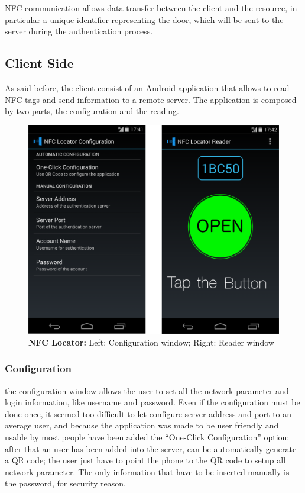 \documentclass[conference]{IEEEtran}
\begin{document}
NFC communication allows data transfer between the client and the resource, in particular a unique identifier representing the door, which will be sent to the server during the authentication process.

\subsection{Client Side}

As said before, the client consist of an Android application that allows to read NFC tags and send information to a remote server.
The application is composed by two parts, the configuration and the reading.

\begin{figure}[h]
\centering
\includegraphics[scale=0.15]{fig2}
\caption{\textbf{NFC Locator: }Left: Configuration window; Right: Reader window}
\label{fig_sim}
\end{figure}

\subsubsection{Configuration}

the configuration window allows the user to set all the network parameter and login information, like username and password.
Even if the configuration must be done once, it seemed too difficult to let configure server address and port to an average user, and because the application was made to be user friendly and usable by most people have been added the “One-Click Configuration” option: after that an user has been added into the server, can be automatically generate a QR code; the user just have to point the phone to the QR code to setup all network parameter. The only information that have to be inserted manually is the password, for security reason.
\end{document}
